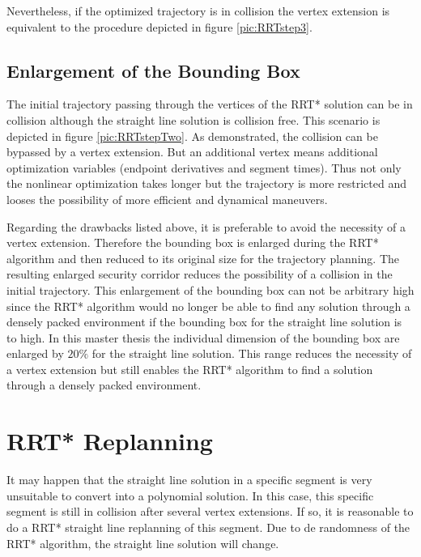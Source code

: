 Nevertheless, if the optimized trajectory is in collision the vertex extension is equivalent to the procedure depicted in figure \ref{pic:RRTstep3}.

\subsection{Enlargement of the Bounding Box}\label{sec:enlargementBBX}

The initial trajectory passing through the vertices of the RRT* solution can be in collision although the straight line solution is collision free. This scenario is depicted in figure \ref{pic:RRTstepTwo}. As demonstrated, the collision can be bypassed by a vertex extension. But an additional vertex means additional optimization variables (endpoint derivatives and segment times). Thus not only the nonlinear optimization takes longer but the trajectory is more restricted and looses the possibility of more efficient and dynamical maneuvers.  \newline

Regarding the drawbacks listed above, it is preferable to avoid the necessity of a vertex extension. Therefore the bounding box is enlarged during the RRT* algorithm and then reduced to its original size for the trajectory planning. The resulting enlarged security corridor reduces the possibility of a collision in the initial trajectory. This enlargement of the bounding box can not be arbitrary high since the RRT* algorithm would no longer be able to find any solution through a densely packed environment if the bounding box for the straight line solution is to high. \newline
In this master thesis the individual dimension of the bounding box are enlarged by $20\%$ for the straight line solution. This range reduces the necessity of a vertex extension but still enables the RRT* algorithm to find a solution through a densely packed environment.
%

\section{RRT* Replanning}\label{sec:replanningPassages}

It may happen that the straight line solution in a specific segment is very unsuitable to convert into a polynomial solution. In this case, this specific segment is still in collision after several vertex extensions. If so, it is reasonable to do a RRT* straight line replanning of this segment. Due to de randomness of the RRT* algorithm, the straight line solution will change. \newline

